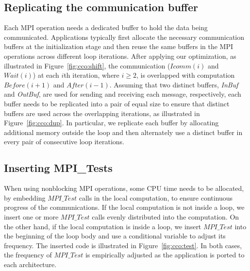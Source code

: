 \subsection{Replicating the communication buffer}

Each MPI operation needs a dedicated buffer to hold the data being
communicated.  Applications typically first allocate the necessary
communication buffers at the initialization stage and then reuse the
same buffers in the MPI operations across different loop
iterations.  After applying our optimization, as illustrated in
Figure~\ref{fig:cco:shift}, the communication ($Icomm(i)$ and
$Wait(i)$) at each $i$th iteration, where $i \geq 2$, is overlapped
with computation $Before(i+1)$ and $After(i-1)$.  Assuming that two
distinct buffers, {\em InBuf} and {\em OutBuf}, are used for sending
and receiving each message, respectively, each buffer needs to be
replicated into a pair of equal size to ensure that distinct buffers
are used across the overlapping iterations, as illustrated in
Figure~\ref{fig:cco:dup}.  In particular, we replicate each buffer by
allocating additional memory outside the loop and then alternately use
a distinct buffer in every pair of consecutive loop iterations.



\subsection{Inserting MPI\_Tests}

When using nonblocking MPI operations, some CPU time needs to be
allocated, by embedding $MPI\_Test$ calls in the local computation, to
ensure continuous progress of the communications.  If the local
computation is not inside a loop, we insert one or more $MPI\_Test$
calls evenly distributed into the computation.  On the other hand, if
the local computation is inside a loop, we insert $MPI\_Test$ into the
beginning of the loop body and use a conditional variable to adjust
its frequency.  The inserted code is illustrated in
Figure~\ref{fig:cco:test}.  In both cases, the frequency of
$MPI\_Test$ is empirically adjusted as the application is ported to
each architecture.

